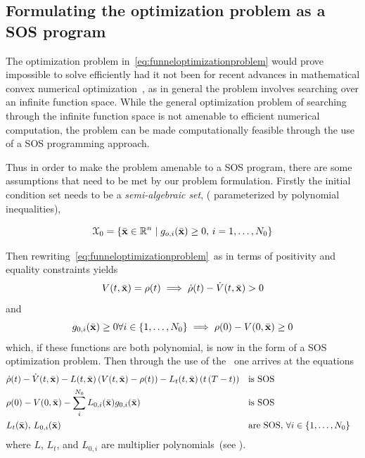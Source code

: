 \subsection{Formulating the optimization problem as a SOS program}

The optimization problem in~\cref{eq:funneloptimizationproblem} would prove
impossible to solve efficiently had it not been for recent advances in
mathematical convex numerical
optimization~\cite[Parillo]{parilloStructuredSemidefinitePrograms}, as in
general the problem involves searching over an infinite function space. While
the general optimization problem of searching through the infinite function
space is not amenable to efficient numerical computation, the problem can be
made computationally feasible through the use of a \ac{SOS} programming
approach.

Thus in order to make the problem amenable to a \ac{SOS} program, there are some
assumptions that need to be met by our problem formulation. Firstly the initial
condition set needs to be a \textit{semi-algebraic set}, (\ie{} parameterized by
polynomial inequalities),

\begin{equation}
  \mathcal{X}_0 = \lbrace\bar{\mathbf{x}} \in \mathbb{R}^n \mid g_{o,i}(\bar{\mathbf{x}}) \geq 0, \, i = 1,\ldots,N_0\rbrace
\end{equation}

Then rewriting~\cref{eq:funneloptimizationproblem}~as in terms of positivity and
equality constraints yields
\begin{equation}
  V(t,\bar{\mathbf{x}}) = \rho(t) \implies \dot{\rho}(t) - \dot{V}(t,\bar{\mathbf{x}}) > 0
\end{equation}
and
\begin{equation}
  g_{0,i}(\bar{\mathbf{x}}) \geq 0 \forall i \in \lbrace1,\ldots,N_0\rbrace \implies \rho(0) - V(0,\bar{\mathbf{x}}) \geq 0
\end{equation}
which, if these functions are both polynomial, is now in the form of a \ac{SOS}
optimization problem. Then through the use of the~ one
arrives at the equations
\begin{align}
  &\dot{\rho}(t) - \dot{V}(t,\bar{\mathbf{x}}) - L(t,\bar{\mathbf{x}})\left( V(t,\bar{\mathbf{x}}) - \rho(t) \right) - L_{t}(t,\bar{\mathbf{x}})\left( t\left( T - t \right) \right)  && \text{is SOS}& \label{eq:sufficient-conditions}\\
  & \rho(0) - V(0,\bar{\mathbf{x}}) - \sum_{i}^{N_{0}} L_{0,i}(\bar{\mathbf{x}})g_{0,i}(\bar{\mathbf{x}}) && \text{is SOS}& \\
  & L_{t}(\bar{\mathbf{x}}), \, L_{0,i}(\bar{\mathbf{x}}) \; &&\text{are SOS}, \, \forall i \in \lbrace1,\ldots,N_{0}\rbrace \label{eq:sufficient-conditions3} \\
\end{align} 
where \(L\), \(L_{t}\), and \(L_{0,i}\) are multiplier polynomials~(see
).

